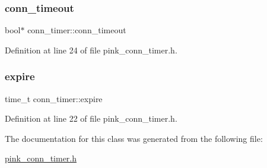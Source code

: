 \subsubsection{\texorpdfstring{conn\+\_\+timeout}{conn\_timeout}}
{\footnotesize\ttfamily bool$\ast$ conn\+\_\+timer\+::conn\+\_\+timeout}



Definition at line 24 of file pink\+\_\+conn\+\_\+timer.\+h.

\mbox{\label{classconn__timer_a2c71b17e51d75dc27a4e0f1f7e443ec5}} 
\subsubsection{\texorpdfstring{expire}{expire}}
{\footnotesize\ttfamily time\+\_\+t conn\+\_\+timer\+::expire}



Definition at line 22 of file pink\+\_\+conn\+\_\+timer.\+h.



The documentation for this class was generated from the following file\+:\begin{DoxyCompactItemize}
\item 
\hyperlink{pink__conn__timer_8h}{pink\+\_\+conn\+\_\+timer.\+h}\end{DoxyCompactItemize}
